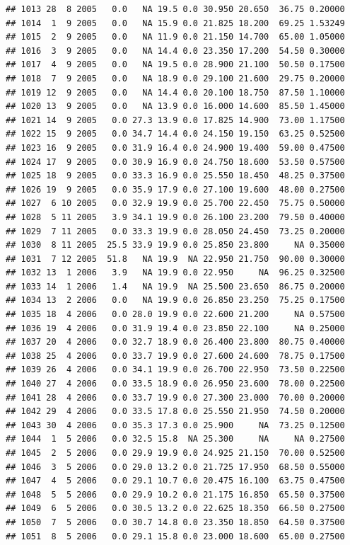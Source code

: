 \documentclass[
]{book}
\begin{document}
\begin{verbatim}
## 1013 28  8 2005   0.0   NA 19.5 0.0 30.950 20.650  36.75 0.20000
## 1014  1  9 2005   0.0   NA 15.9 0.0 21.825 18.200  69.25 1.53249
## 1015  2  9 2005   0.0   NA 11.9 0.0 21.150 14.700  65.00 1.05000
## 1016  3  9 2005   0.0   NA 14.4 0.0 23.350 17.200  54.50 0.30000
## 1017  4  9 2005   0.0   NA 19.5 0.0 28.900 21.100  50.50 0.17500
## 1018  7  9 2005   0.0   NA 18.9 0.0 29.100 21.600  29.75 0.20000
## 1019 12  9 2005   0.0   NA 14.4 0.0 20.100 18.750  87.50 1.10000
## 1020 13  9 2005   0.0   NA 13.9 0.0 16.000 14.600  85.50 1.45000
## 1021 14  9 2005   0.0 27.3 13.9 0.0 17.825 14.900  73.00 1.17500
## 1022 15  9 2005   0.0 34.7 14.4 0.0 24.150 19.150  63.25 0.52500
## 1023 16  9 2005   0.0 31.9 16.4 0.0 24.900 19.400  59.00 0.47500
## 1024 17  9 2005   0.0 30.9 16.9 0.0 24.750 18.600  53.50 0.57500
## 1025 18  9 2005   0.0 33.3 16.9 0.0 25.550 18.450  48.25 0.37500
## 1026 19  9 2005   0.0 35.9 17.9 0.0 27.100 19.600  48.00 0.27500
## 1027  6 10 2005   0.0 32.9 19.9 0.0 25.700 22.450  75.75 0.50000
## 1028  5 11 2005   3.9 34.1 19.9 0.0 26.100 23.200  79.50 0.40000
## 1029  7 11 2005   0.0 33.3 19.9 0.0 28.050 24.450  73.25 0.20000
## 1030  8 11 2005  25.5 33.9 19.9 0.0 25.850 23.800     NA 0.35000
## 1031  7 12 2005  51.8   NA 19.9  NA 22.950 21.750  90.00 0.30000
## 1032 13  1 2006   3.9   NA 19.9 0.0 22.950     NA  96.25 0.32500
## 1033 14  1 2006   1.4   NA 19.9  NA 25.500 23.650  86.75 0.20000
## 1034 13  2 2006   0.0   NA 19.9 0.0 26.850 23.250  75.25 0.17500
## 1035 18  4 2006   0.0 28.0 19.9 0.0 22.600 21.200     NA 0.57500
## 1036 19  4 2006   0.0 31.9 19.4 0.0 23.850 22.100     NA 0.25000
## 1037 20  4 2006   0.0 32.7 18.9 0.0 26.400 23.800  80.75 0.40000
## 1038 25  4 2006   0.0 33.7 19.9 0.0 27.600 24.600  78.75 0.17500
## 1039 26  4 2006   0.0 34.1 19.9 0.0 26.700 22.950  73.50 0.22500
## 1040 27  4 2006   0.0 33.5 18.9 0.0 26.950 23.600  78.00 0.22500
## 1041 28  4 2006   0.0 33.7 19.9 0.0 27.300 23.000  70.00 0.20000
## 1042 29  4 2006   0.0 33.5 17.8 0.0 25.550 21.950  74.50 0.20000
## 1043 30  4 2006   0.0 35.3 17.3 0.0 25.900     NA  73.25 0.12500
## 1044  1  5 2006   0.0 32.5 15.8  NA 25.300     NA     NA 0.27500
## 1045  2  5 2006   0.0 29.9 19.9 0.0 24.925 21.150  70.00 0.52500
## 1046  3  5 2006   0.0 29.0 13.2 0.0 21.725 17.950  68.50 0.55000
## 1047  4  5 2006   0.0 29.1 10.7 0.0 20.475 16.100  63.75 0.47500
## 1048  5  5 2006   0.0 29.9 10.2 0.0 21.175 16.850  65.50 0.37500
## 1049  6  5 2006   0.0 30.5 13.2 0.0 22.625 18.350  66.50 0.27500
## 1050  7  5 2006   0.0 30.7 14.8 0.0 23.350 18.850  64.50 0.37500
## 1051  8  5 2006   0.0 29.1 15.8 0.0 23.000 18.600  65.00 0.27500

\end{verbatim}
\end{document}

